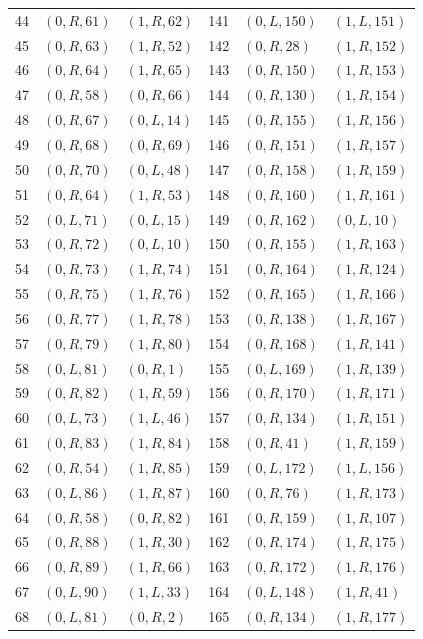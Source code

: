 \begin{longtable}{r@{\quad}ll@{\qquad}r@{\quad}ll}
44 & $(0,R,61)$ & $(1,R,62)$ & 141 & $(0,L,150)$ & $(1,L,151)$\\
45 & $(0,R,63)$ & $(1,R,52)$ & 142 & $(0,R,28)$ & $(1,R,152)$\\
46 & $(0,R,64)$ & $(1,R,65)$ & 143 & $(0,R,150)$ & $(1,R,153)$\\
47 & $(0,R,58)$ & $(0,R,66)$ & 144 & $(0,R,130)$ & $(1,R,154)$\\
48 & $(0,R,67)$ & $(0,L,14)$ & 145 & $(0,R,155)$ & $(1,R,156)$\\
49 & $(0,R,68)$ & $(0,R,69)$ & 146 & $(0,R,151)$ & $(1,R,157)$\\
50 & $(0,R,70)$ & $(0,L,48)$ & 147 & $(0,R,158)$ & $(1,R,159)$\\
51 & $(0,R,64)$ & $(1,R,53)$ & 148 & $(0,R,160)$ & $(1,R,161)$\\
52 & $(0,L,71)$ & $(0,L,15)$ & 149 & $(0,R,162)$ & $(0,L,10)$\\
53 & $(0,R,72)$ & $(0,L,10)$ & 150 & $(0,R,155)$ & $(1,R,163)$\\
54 & $(0,R,73)$ & $(1,R,74)$ & 151 & $(0,R,164)$ & $(1,R,124)$\\
55 & $(0,R,75)$ & $(1,R,76)$ & 152 & $(0,R,165)$ & $(1,R,166)$\\
56 & $(0,R,77)$ & $(1,R,78)$ & 153 & $(0,R,138)$ & $(1,R,167)$\\
57 & $(0,R,79)$ & $(1,R,80)$ & 154 & $(0,R,168)$ & $(1,R,141)$\\
58 & $(0,L,81)$ & $(0,R,1)$ & 155 & $(0,L,169)$ & $(1,R,139)$\\
59 & $(0,R,82)$ & $(1,R,59)$ & 156 & $(0,R,170)$ & $(1,R,171)$\\
60 & $(0,L,73)$ & $(1,L,46)$ & 157 & $(0,R,134)$ & $(1,R,151)$\\
61 & $(0,R,83)$ & $(1,R,84)$ & 158 & $(0,R,41)$ & $(1,R,159)$\\
62 & $(0,R,54)$ & $(1,R,85)$ & 159 & $(0,L,172)$ & $(1,L,156)$\\
63 & $(0,L,86)$ & $(1,R,87)$ & 160 & $(0,R,76)$ & $(1,R,173)$\\
64 & $(0,R,58)$ & $(0,R,82)$ & 161 & $(0,R,159)$ & $(1,R,107)$\\
65 & $(0,R,88)$ & $(1,R,30)$ & 162 & $(0,R,174)$ & $(1,R,175)$\\
66 & $(0,R,89)$ & $(1,R,66)$ & 163 & $(0,R,172)$ & $(1,R,176)$\\
67 & $(0,L,90)$ & $(1,L,33)$ & 164 & $(0,L,148)$ & $(1,R,41)$\\
68 & $(0,L,81)$ & $(0,R,2)$ & 165 & $(0,R,134)$ & $(1,R,177)$\\

\end{longtable}

